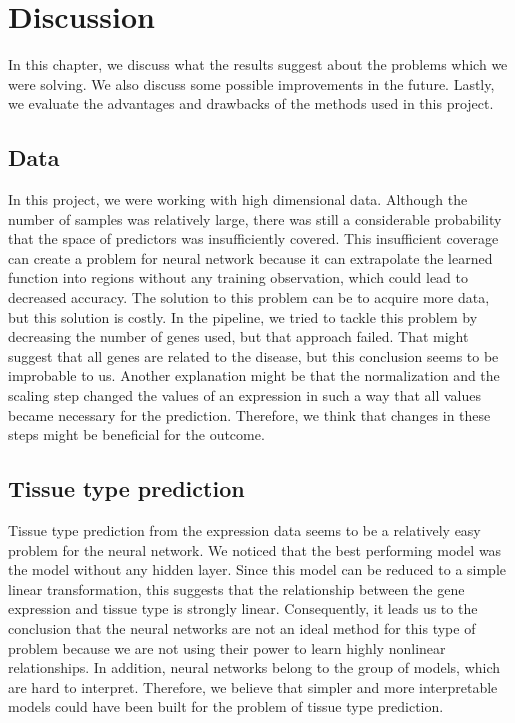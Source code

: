 \chapter{Discussion}
In this chapter, we discuss what the results suggest about the problems which we were solving.
We also discuss some possible improvements in the future.
Lastly, we evaluate the advantages and drawbacks of the methods used in this project.



\section{Data}
In this project, we were working with high dimensional data.
Although the number of samples was relatively large, there was still a considerable probability that the space of predictors was insufficiently covered.
This insufficient coverage can create a problem for neural network because it can extrapolate the learned function into regions without any training observation, which could lead to decreased accuracy.
The solution to this problem can be to acquire more data, but this solution is costly.
In the pipeline, we tried to tackle this problem by decreasing the number of genes used, but that approach failed.
That might suggest that all genes are related to the disease, but this conclusion seems to be improbable to us.
Another explanation might be that the normalization and the scaling step changed the values of an expression in such a way that all values became necessary for the prediction.
Therefore, we think that changes in these steps might be beneficial for the outcome.

\section{Tissue type prediction}
Tissue type prediction from the expression data seems to be a relatively easy problem for the neural network.
We noticed that the best performing model was the model without any hidden layer.
Since this model can be reduced to a simple linear transformation, this suggests that the relationship between the gene expression and tissue type is strongly linear.
Consequently, it leads us to the conclusion that the neural networks are not an ideal method for this type of problem because we are not using their power to learn highly nonlinear relationships.
In addition, neural networks belong to the group of models, which are hard to interpret.
Therefore, we believe that simpler and more interpretable models could have been built for the problem of tissue type prediction.


